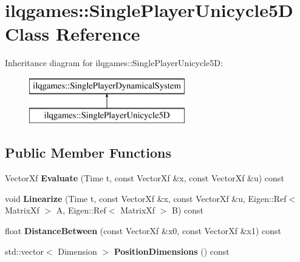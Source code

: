\hypertarget{classilqgames_1_1_single_player_unicycle5_d}{}\section{ilqgames\+:\+:Single\+Player\+Unicycle5D Class Reference}
\label{classilqgames_1_1_single_player_unicycle5_d}
Inheritance diagram for ilqgames\+:\+:Single\+Player\+Unicycle5D\+:\begin{figure}[H]
\begin{center}
\leavevmode
\includegraphics[height=2.000000cm]{classilqgames_1_1_single_player_unicycle5_d}
\end{center}
\end{figure}
\subsection*{Public Member Functions}
\begin{DoxyCompactItemize}
\item 
Vector\+Xf {\bfseries Evaluate} (Time t, const Vector\+Xf \&x, const Vector\+Xf \&u) const \hypertarget{classilqgames_1_1_single_player_unicycle5_d_a51f0dd94b0872632256ab0e31b760569}{}\label{classilqgames_1_1_single_player_unicycle5_d_a51f0dd94b0872632256ab0e31b760569}

\item 
void {\bfseries Linearize} (Time t, const Vector\+Xf \&x, const Vector\+Xf \&u, Eigen\+::\+Ref$<$ Matrix\+Xf $>$ A, Eigen\+::\+Ref$<$ Matrix\+Xf $>$ B) const \hypertarget{classilqgames_1_1_single_player_unicycle5_d_ad4933f11825d20f33e9823ebd0428a01}{}\label{classilqgames_1_1_single_player_unicycle5_d_ad4933f11825d20f33e9823ebd0428a01}

\item 
float {\bfseries Distance\+Between} (const Vector\+Xf \&x0, const Vector\+Xf \&x1) const \hypertarget{classilqgames_1_1_single_player_unicycle5_d_ac20c427901e0e594d63155d0d7944b70}{}\label{classilqgames_1_1_single_player_unicycle5_d_ac20c427901e0e594d63155d0d7944b70}

\item 
std\+::vector$<$ Dimension $>$ {\bfseries Position\+Dimensions} () const \hypertarget{classilqgames_1_1_single_player_unicycle5_d_a0245cb33ac6ed95ce5331692c36e2a0d}{}\label{classilqgames_1_1_single_player_unicycle5_d_a0245cb33ac6ed95ce5331692c36e2a0d}

\end{DoxyCompactItemize}
